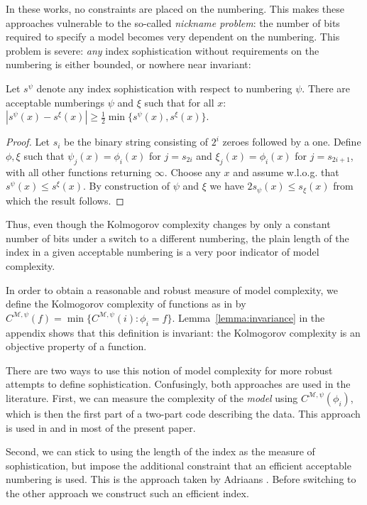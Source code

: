 \documentclass{style/llncs}
\newcommand{\M}{\mathscr M}
\begin{document}
In these works, no constraints are placed on the numbering. This makes these approaches vulnerable to the so-called \emph{nickname problem}: the number of bits required to specify a model becomes very dependent on the numbering. This problem is severe: \emph{any} index sophistication without requirements on the numbering is either bounded, or nowhere near invariant:

\begin{lemma}
Let $s^\psi$ denote any index sophistication with respect to numbering $\psi$.
There are acceptable numberings $\psi$ and $\xi$ such that for all $x$:\\
\-\hspace{2.8em} $|s^\psi(x) - s^\xi(x)|\geq \tfrac{1}{2}\min\{s^\psi(x),s^\xi(x)\}$.
\end{lemma}
\begin{proof}
Let $s_i$ be the binary string consisting of $2^{i}$ zeroes followed by a one. Define $\phi, \xi$ such that $\psi_j(x) = \phi_i(x)$ for $j = s_{2i}$ and $\xi_j(x) = \phi_i(x)$ for $j = s_{2i+1}$, with all other functions returning $\infty$. Choose any $x$ and assume w.l.o.g. that $s^\psi(x)\le s^\xi(x)$. By construction of $\psi$ and $\xi$ we have $2s_\psi(x)  \leq s_\xi(x)$ from which the result follows.
\end{proof}
Thus, even though the Kolmogorov complexity changes by only a constant number of bits under a switch to a different numbering, the plain length of the index in a given acceptable numbering is a very poor indicator of model complexity.

In order to obtain a reasonable and robust measure of model complexity, we define the Kolmogorov complexity of functions as in \cite{grunwald2004shannon,vitanyi2004meaningful} by $C^{\M,\psi}(f) = \min\{C^{\M,\psi}(i):\phi_i=f\}$.
Lemma~\ref{lemma:invariance} in the appendix shows that this definition is invariant: the Kolmogorov complexity is an objective property of a function.

There are two ways to use this notion of model complexity for more robust attempts to define sophistication. Confusingly, both approaches are used in the literature.
First, we can measure the complexity of the \emph{model} using $C^{\M,\psi}(\phi_i)$, which is then the first part of a two-part code describing the data. This approach is used in  \cite{cover1985kolmogorov,gacs2001algorithmic,vitanyi2004meaningful,gellmann1996information} and in most of the present paper.

Second, we can stick to using the length of the index as the measure of sophistication, but impose the additional constraint that an efficient acceptable numbering is used. This is the approach taken by Adriaans \cite{adriaans2012facticity}.  Before switching to the other approach we construct such an efficient index.
\end{document}
